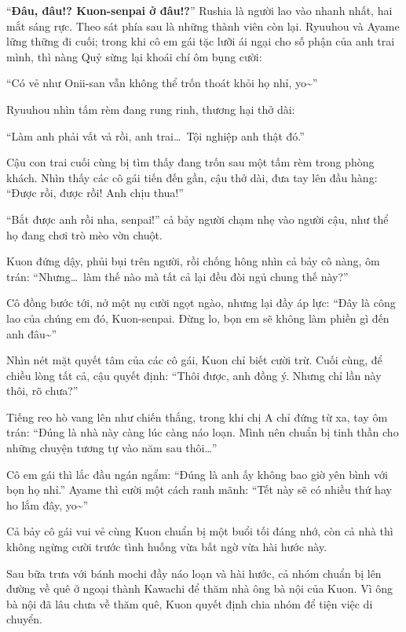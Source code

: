 \documentclass[../main.tex]{subfiles}
\begin{document}
``\textbf{Đâu, đâu!? Kuon-senpai ở đâu!?}'' Rushia là người lao vào nhanh nhất, hai mắt sáng rực. Theo sát phía sau là những thành viên còn lại. Ryuuhou và Ayame lững thững đi cuối; trong khi cô em gái tặc lưỡi ái ngại cho số phận của anh trai mình, thì nàng Quỷ sừng lại khoái chí ôm bụng cười:

``Có vẻ như Onii-san vẫn không thể trốn thoát khỏi họ nhỉ, yo\~{}''

Ryuuhou nhìn tấm rèm đang rung rinh, thương hại thở dài:

``Làm anh phải vất vả rồi, anh trai\dots\ Tội nghiệp anh thật đó.''

Cậu con trai cuối cùng bị tìm thấy đang trốn sau một tấm rèm trong phòng khách. Nhìn thấy các cô gái tiến đến gần, cậu thở dài, đưa tay lên đầu hàng: ``Được rồi, được rồi! Anh chịu thua!''

``Bắt được anh rồi nha, senpai!'' cả bảy người chạm nhẹ vào người cậu, như thể họ đang chơi trò mèo vờn chuột.

Kuon đứng dậy, phủi bụi trên người, rồi chống hông nhìn cả bảy cô nàng, ôm trán: ``Nhưng\dots\ làm thế nào mà tất cả lại đều đòi ngủ chung thế này?''

Cô đồng bước tới, nở một nụ cười ngọt ngào, nhưng lại đầy áp lực: ``Đây là công lao của chúng em đó, Kuon-senpai. Đừng lo, bọn em sẽ không làm phiền gì đến anh đâu\~{}''

Nhìn nét mặt quyết tâm của các cô gái, Kuon chỉ biết cười trừ. Cuối cùng, để chiều lòng tất cả, cậu quyết định: ``Thôi được, anh đồng ý. Nhưng chỉ lần này thôi, rõ chưa?''

Tiếng reo hò vang lên như chiến thắng, trong khi chị A chỉ đứng từ xa, tay ôm trán: ``Đúng là nhà này càng lúc càng náo loạn. Mình nên chuẩn bị tinh thần cho những chuyện tương tự vào năm sau thôi\dots''

Cô em gái thì lắc đầu ngán ngẩm: ``Đúng là anh ấy không bao giờ yên bình với bọn họ nhỉ.'' Ayame thì cười một cách ranh mãnh: ``Tết này sẽ có nhiều thứ hay ho lắm đây, yo\~{}''

Cả bảy cô gái vui vẻ cùng Kuon chuẩn bị một buổi tối đáng nhớ, còn cả nhà thì không ngừng cười trước tình huống vừa bất ngờ vừa hài hước này.

\ct

Sau bữa trưa với bánh mochi đầy náo loạn và hài hước, cả nhóm chuẩn bị lên đường về quê ở ngoại thành Kawachi để thăm nhà ông bà nội của Kuon. Vì ông bà nội đã lâu chưa về thăm quê, Kuon quyết định chia nhóm để tiện việc di chuyển.
\end{document}
